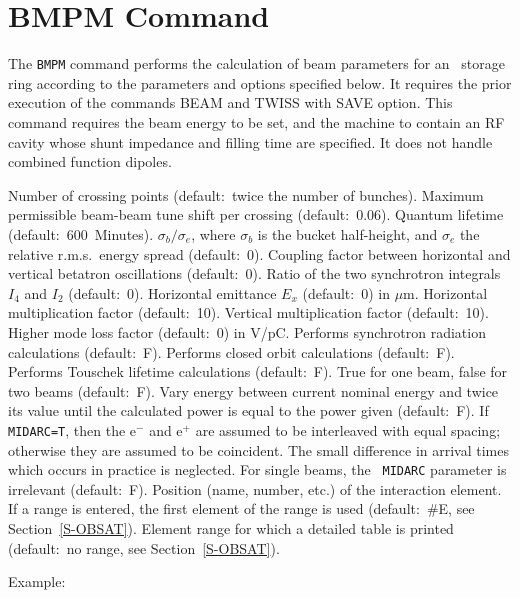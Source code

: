 \section{BMPM Command}
\label{S-BMPM}
The {\tt BMPM} command performs the calculation of beam parameters
for an \epem\ storage ring according to the parameters and options
specified below.
It requires the prior execution of the commands BEAM and TWISS
with SAVE option.
This command requires the beam energy to be set,
and the machine to contain an RF cavity
whose shunt impedance and filling time are specified.
It does not handle combined function dipoles.
\begin{mylist}
Number of crossing points (default:~twice the number of bunches).
Maximum permissible beam-beam tune shift per crossing (default:~0.06).
Quantum lifetime (default:~600~Minutes).
\(\sigma_b/\sigma_e\), where \(\sigma_b\) is the bucket half-height,
and \(\sigma _e\) the relative r.m.s.\ energy spread (default:~0).
Coupling factor between horizontal and vertical betatron
oscillations (default:~0).
Ratio of the two synchrotron integrals \(I_4\) and \(I_2\) (default:~0).
Horizontal emittance \(E_x\) (default:~0) in \(\mu\)m.
Horizontal multiplication factor (default:~10).
Vertical multiplication factor (default:~10).
Higher mode loss factor (default:~0) in V/pC.
Performs synchrotron radiation calculations (default:~F).
Performs closed orbit calculations (default:~F).
Performs Touschek lifetime calculations (default:~F).
True for one beam, false for two beams (default:~F).
Vary energy between current nominal energy and twice its value
until the calculated power is equal to the power given (default:~F).
If {\tt MIDARC=T}, then the e\({}^-\) and e\({}^+\) are
assumed to be interleaved with equal spacing; otherwise they are
assumed to be coincident. The small difference in arrival times which
occurs in practice is neglected. For single beams, the {\tt
MIDARC} parameter is irrelevant (default:~F).
Position (name, number, etc.) of the interaction element. If a range
is entered, the first element of the range is used
(default:~\#E, see Section~\ref{S-OBSAT}).
Element range for which a detailed table is printed
(default:~no range, see Section~\ref{S-OBSAT}).
\end{mylist}
Example:
